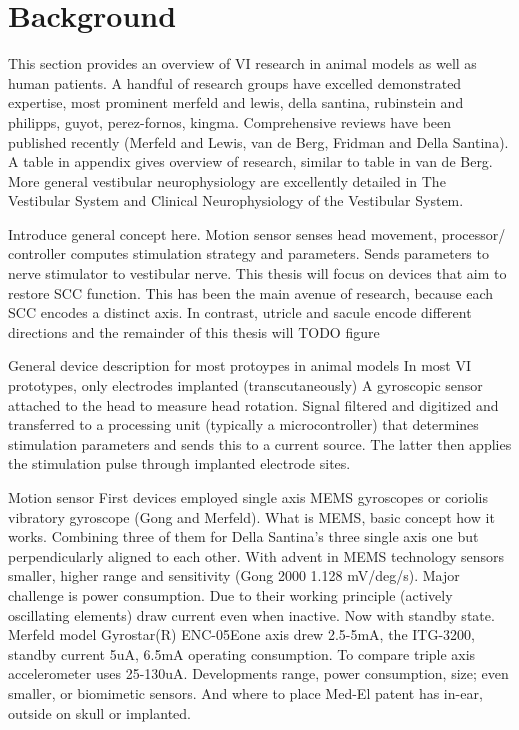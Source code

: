 \chapter{Background}\label{sec:background}
This section provides an overview of VI research in animal models as well as human patients. A handful of research groups have excelled demonstrated expertise, most prominent merfeld and lewis, della santina, rubinstein and philipps, guyot, perez-fornos, kingma. Comprehensive reviews have been published recently (Merfeld and Lewis, van de Berg, Fridman and Della Santina). A table in appendix gives overview of research, similar to table in van de Berg. More general vestibular neurophysiology are excellently detailed in The Vestibular System and Clinical Neurophysiology of the Vestibular System. 

Introduce general concept here. Motion sensor senses head movement, processor/ controller computes stimulation strategy and parameters. Sends parameters to nerve stimulator to vestibular nerve. This thesis will focus on devices that aim to restore SCC function. This has been the main avenue of research, because each SCC encodes a distinct axis. In contrast, utricle and sacule encode different directions and the remainder of this thesis will 
TODO figure

General device description for most protoypes in animal models
In most VI prototypes, only electrodes implanted (transcutaneously) 
A gyroscopic sensor attached to the head to measure head rotation. Signal filtered and digitized and transferred to a processing unit (typically a microcontroller) that determines stimulation parameters and sends this to a current source. The latter then applies the stimulation pulse through implanted electrode sites.

Motion sensor
First devices employed single axis MEMS gyroscopes or coriolis vibratory gyroscope (Gong and Merfeld). What is MEMS, basic concept how it works. Combining three of them for Della Santina's three single axis one but perpendicularly aligned to each other. With advent in MEMS technology sensors smaller, higher range and sensitivity (Gong 2000 1.128 mV/deg/s). Major challenge is power consumption. Due to their working principle (actively oscillating elements) draw current even when inactive. Now with standby state. Merfeld model Gyrostar(R) ENC-05Eone axis drew 2.5-5mA, the ITG-3200, standby current 5uA, 6.5mA operating consumption. To compare triple axis accelerometer uses 25-130uA. Developments range, power consumption, size; even smaller, or biomimetic sensors. And where to place Med-El patent has in-ear, outside on skull or implanted.

